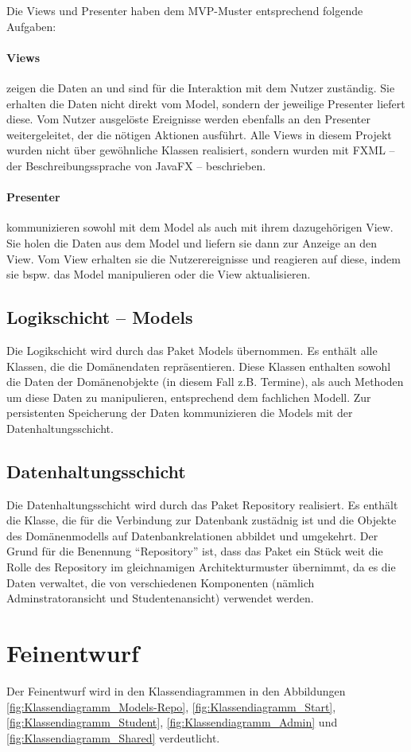 Die Views und Presenter haben dem MVP-Muster entsprechend folgende Aufgaben:
\paragraph{Views} zeigen die Daten an und sind für die Interaktion mit dem Nutzer zuständig. Sie erhalten die Daten nicht direkt vom Model, sondern der jeweilige Presenter liefert diese. Vom Nutzer ausgelöste Ereignisse werden ebenfalls an den Presenter weitergeleitet, der die nötigen Aktionen ausführt. Alle Views in diesem Projekt wurden nicht über gewöhnliche Klassen realisiert, sondern wurden mit FXML – der Beschreibungssprache von JavaFX – beschrieben.
\paragraph{Presenter} kommunizieren sowohl mit dem Model als auch mit ihrem dazugehörigen View. Sie holen die Daten aus dem Model und liefern sie dann zur Anzeige an den View. Vom View erhalten sie die Nutzerereignisse und reagieren auf diese, indem sie bspw. das Model manipulieren oder die View aktualisieren.

\subsection{Logikschicht – Models}
Die Logikschicht wird durch das Paket Models übernommen. Es enthält alle Klassen, die die Domänendaten repräsentieren. Diese Klassen enthalten sowohl die Daten der Domänenobjekte (in diesem Fall z.B. Termine), als auch Methoden um diese Daten zu manipulieren, entsprechend dem fachlichen Modell. Zur persistenten Speicherung der Daten kommunizieren die Models mit der Datenhaltungsschicht.

\subsection{Datenhaltungsschicht}
Die Datenhaltungsschicht wird durch das Paket Repository realisiert. Es enthält die Klasse, die für die Verbindung zur Datenbank zustädnig ist und die Objekte des Domänenmodells auf Datenbankrelationen abbildet und umgekehrt. Der Grund für die Benennung "`Repository"' ist, dass das Paket ein Stück weit die Rolle des Repository im gleichnamigen Architekturmuster übernimmt, da es die Daten verwaltet, die von verschiedenen Komponenten (nämlich Adminstratoransicht und Studentenansicht) verwendet werden.

\section{Feinentwurf}
Der Feinentwurf wird in den Klassendiagrammen in den Abbildungen \ref{fig:Klassendiagramm_Models-Repo}, \ref{fig:Klassendiagramm_Start}, \ref{fig:Klassendiagramm_Student}, \ref{fig:Klassendiagramm_Admin} und \ref{fig:Klassendiagramm_Shared} verdeutlicht.

